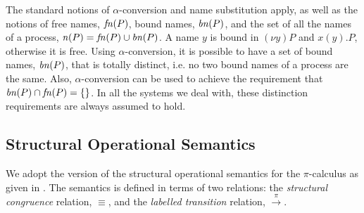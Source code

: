 \documentclass[10pt,a4paper,final,oneside,fleqn]{book}
\newcommand*{\todefpipi}{\mathbin{\mathop{\longrightarrow}\limits^{\pi}}}
\begin{document}
The standard notions of $\alpha$-conversion and name substitution apply, as well as the notions of free names, $\mbox{{\itshape fn\/}}(P)$, bound names, $\mbox{{\itshape bn\/}}(P)$, and the set of all the names of a process, $\mbox{{\itshape n\/}}(P)=\mbox{{\itshape fn\/}}(P)\cup\mbox{{\itshape bn\/}}(P)$.  A name $y$ is bound in $(\nu y)P$ and $x(y).P$, otherwise it is free.  Using $\alpha$-conversion, it is possible to have a set of bound names, $\mbox{{\itshape bn\/}}(P)$, that is totally distinct, i.e. no two bound names of a process are the same.  Also, $\alpha$-conversion can be used to achieve the requirement that $\mbox{{\itshape bn\/}}(P)\cap\mbox{{\itshape fn\/}}(P)=\{\}$. In all the systems we deal with, these distinction requirements are always assumed to hold.
\subsection{Structural Operational Semantics\label{sect:sospi}}
We adopt the version of the structural operational semantics for the $\pi$-calculus as given in \cite{cattani1}.  The semantics is defined in terms of two relations: the {\itshape structural congruence\/} relation, $\equiv$, and the {\itshape labelled transition\/} relation, $\todefpipi$.
\end{document}
